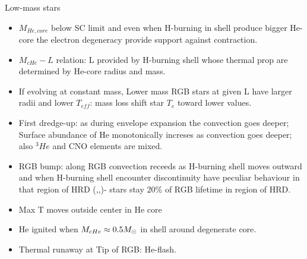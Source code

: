 \begin{frame}{Low-mass stars}
    \begin{itemize}
        \item $M_{He,core}$ below SC limit and even when H-burning in shell produce bigger He-core the electron degeneracy provide support against contraction.
        \item $M_{cHe}-L$ relation: L provided by H-burning shell whose thermal prop are determined by He-core radius and mass.
        \item If evolving  at constant mass, Lower mass RGB stars at given L have larger radii and lower $T_{eff}$: mass loss shift star $T_e$ toward lower values.
        \item First dredge-up: as  during envelope expansion the convection goes deeper; Surface abundance of He monotonically increses as convection goes deeper; also $^3He$ and CNO elements are mixed.
        \item RGB bump: along RGB convection receeds as H-burning shell moves outward and when H-burning shell encounter discontinuity have peculiar behaviour in that region of HRD (,,)- stars stay $20\%$ of RGB lifetime in region of HRD.
        \item Max T moves outside center in He core
        \item He ignited when $M_{cHe}\approx0.5M_{\odot}{}$ in shell around degenerate core.
        \item Thermal runaway at Tip of RGB: He-flash.
    \end{itemize}
\end{frame}

